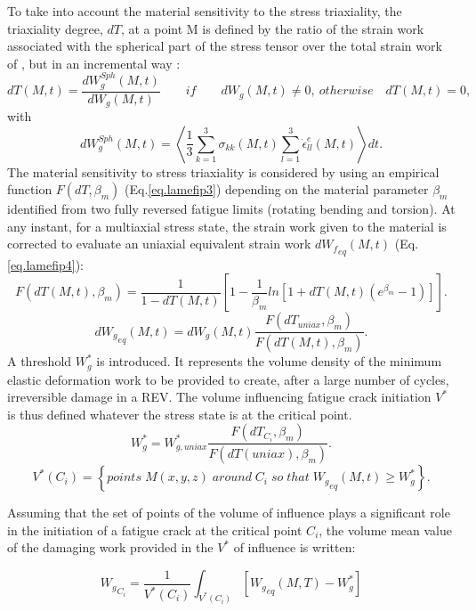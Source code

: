 To take into account the material sensitivity to the stress triaxiality, the triaxiality degree, $dT$, at a point M is defined by the ratio of the strain work associated with the spherical part of the stress tensor over the total strain work of \cite{banvillet2003volumetric}, but in an incremental way :
$$dT(M,t)=\dfrac{dW_g^{Sph}(M,t)}{dW_g(M,t)} \qquad if \qquad  dW_g(M,t)\neq0,\ otherwise \quad dT(M,t)=0,$$
with
$$dW_g^{Sph}(M,t)=\left\langle \dfrac{1}{3}\sum_{k=1}^{3}\sigma_{kk}(M,t)\sum_{l=1}^{3}\dot{\epsilon}_{ll}^e(M,t)\right\rangle dt.$$
The material sensitivity to stress triaxiality is considered by using an empirical function
$F(dT,\beta_m)$ (Eq.\eqref{eq.lamefip3}) depending on the material parameter $\beta_m$ identified from two fully reversed
fatigue limits (rotating bending and torsion). At any instant, for a multiaxial stress state, the
strain work given to the material is corrected to evaluate an uniaxial equivalent strain work
$d{W_f}_{eq} (M,t)$ (Eq.\eqref{eq.lamefip4}):
\begin{equation}
F(dT(M,t),\beta_m)=\dfrac{1}{1-dT(M,t)}\left[ 1-\dfrac{1}{\beta_m}ln\left[1+dT(M,t)(e^{\beta_m}-1) \right] \right] .
\label{eq.lamefip3}
\end{equation}
\begin{equation}
d{W_g}_{eq} (M,t)=d{W_g}(M,t)\dfrac{F(dT_{uniax},\beta_m)}{F(dT(M,t),\beta_m)}.
\label{eq.lamefip4}
\end{equation}
A threshold $W_g^*$ is introduced. It represents the volume density of the minimum elastic deformation work to be provided to create, after a large number of cycles, irreversible damage in a REV. The volume influencing fatigue crack initiation $V^*$ is thus
defined whatever the stress state is at the critical point.
\begin{equation}
W_g^*=W^*_{g,uniax}\dfrac{F(dT_{C_i},\beta_m)}{F(dT(uniax),\beta_m)}.
\label{eq.lamefip5}
\end{equation}
\begin{equation}
V^*(C_i)=\left\lbrace points \; M(x,y,z) \; around \; C_i \; so \; that \; {W_g}_{eq} (M,t)\geqslant W_g^*\right\rbrace .
\label{eq.lamefip6}
\end{equation}

 Assuming that the set of points of the volume of influence plays a significant role in the initiation of a fatigue crack at the critical point $C_i$, the volume mean value of the damaging work provided in the $V^*$ of influence is written:

$${W_g}_{C_i}=\dfrac{1}{V^*(C_i)}\int_{V^*(C_i)}\left[{W_g}_{eq}(M,T)- W_g^*\right] $$


